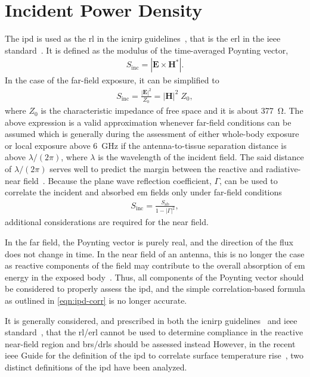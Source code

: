 \section{Incident Power Density}
The \gls{ipd} is used as the \gls{rl} in the \gls{icnirp} guidelines~\cite{ICNIRP2020Guidelines}, that is the \gls{erl} in the \gls{ieee} standard~\cite{IEEE2019Standard}.
It is defined as the modulus of the time-averaged Poynting vector,
\begin{align}
    \label{eqn:ipd}
    S_\text{inc} = |\mathbf{E} \times \mathbf{H}^* |.
\end{align}
In the case of the far-field exposure, it can be simplified to
\begin{align}
    \label{eqn:ipd-far-field}
    S_\text{inc} = \frac{|\mathbf{E}|^2}{Z_0} = |\mathbf{H}|^2 \; Z_0,
\end{align}
where $Z_0$ is the characteristic impedance of free space and it is about \SI{377}{\ohm}.
The above expression is a valid approximation whenever far-field conditions can be assumed which is generally during the assessment of either whole-body exposure or local exposure above \SI{6}{\GHz} if the antenna-to-tissue separation distance is above $\lambda / (2 \pi)$, where $\lambda$ is the wavelength of the incident field.
The said distance of $\lambda / (2 \pi)$ serves well to predict the margin between the reactive and radiative-near field~\cite{Carrasco2019Exposure}.
Because the plane wave reflection coefficient, $\Gamma$, can be used to correlate the incident and absorbed \gls{em} fields only under far-field conditions
\begin{align}
    \label{eqn:ipd-corr}
    S_\text{inc} = \frac{S_\text{ab}}{1 - |\Gamma|^2},
\end{align}
additional considerations are required for the near field.

In the far field, the Poynting vector is purely real, and the direction of the flux does not change in time.
In the near field of an antenna, this is no longer the case as reactive components of the field may contribute to the overall absorption of \gls{em} energy in the exposed body~\cite{Kuster1992Energy}.
Thus, all components of the Poynting vector should be considered to properly assess the \gls{ipd}, and the simple correlation-based formula as outlined in \cref{eqn:ipd-corr} is no longer accurate.

It is generally considered, and prescribed in both the \gls{icnirp} guidelines~\cite{ICNIRP2020Guidelines} and \gls{ieee} standard~\cite{IEEE2019Standard}, that the \gls{rl}/\gls{erl} cannot be used to determine compliance in the reactive near-field region and \gls{br}s/\gls{drl}s should be assessed instead
However, in the recent \gls{ieee} Guide for the definition of the \gls{ipd} to correlate surface temperature rise~\cite{IEEE2021Guide}, two distinct definitions of the \gls{ipd} have been analyzed.

